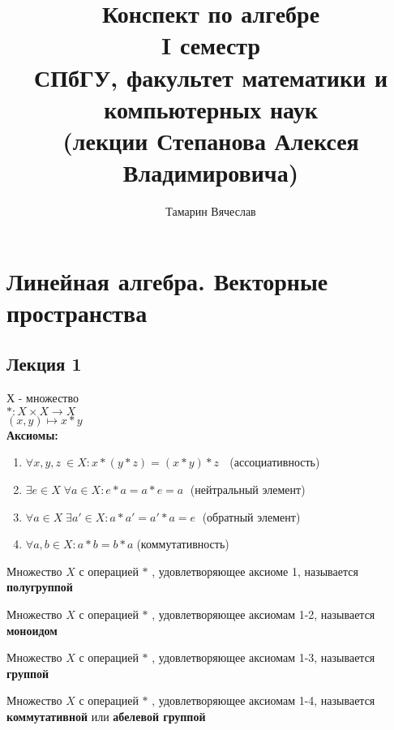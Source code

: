 \documentclass[11pt]{book}
\title{Конспект по алгебре \\ I семестр \\
СПбГУ, факультет математики и компьютерных наук \\
(лекции Степанова Алексея Владимировича)}
\author{Тамарин Вячеслав}
\theoremstyle{definition}
\theoremstyle{plain}
\theoremstyle{plain}
\theoremstyle{definition}
\theoremstyle{remark}
\begin{document}
\maketitle
\tableofcontents

\chapter{Линейная алгебра. Векторные пространства}
\section{Лекция 1}
Х - множество\\
$ *: X \times X \to X$\\
$ (x, y) \mapsto x * y$\\
{\bf Аксиомы:}
\begin{enumerate}
    \item $\forall x,y,z \: \in X: x*(y*z) = (x*y)*z$ $\;$ (ассоциативность)
    \item $\exists e \in X \; \forall a \in X: e*a = a*e = a \;$ (нейтральный элемент)
    \item $\forall a \in X \; \exists a' \in X: a*a' = a' * a = e \;$ (обратный элемент)
    \item $\forall a, b \in X: a * b = b * a \; $(коммутативность)
\end{enumerate}

\begin{defn}
Множество $X$ с операцией $*$ , удовлетворяющее  аксиоме 1, называется {\bf полугруппой}
\end{defn}

\begin{defn}
Множество $X$ с операцией $*$ , удовлетворяющее  аксиомам 1-2, называется {\bf моноидом}
\end{defn}

\begin{defn}
Множество $X$ с операцией $*$ , удовлетворяющее  аксиомам 1-3, называется {\bf группой}
\end{defn}

\begin{defn}
Множество $X$ с операцией $*$ , удовлетворяющее  аксиомам 1-4, называется {\bf коммутативной} или {\bf абелевой группой}
\end{defn}
\end{document}
